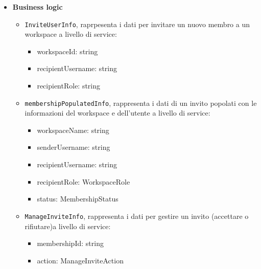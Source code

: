 \documentclass[a4paper, 11pt]{article}
\begin{document}
\begin{itemize}
	\item \textbf{Business logic}
    	\begin{itemize}
      		\item \texttt{InviteUserInfo}, raprpesenta i dati per invitare un nuovo membro a un workspace a livello di service:
    			\begin{itemize}
          			\item workspaceId: string
          			\item recipientUsername: string
          			\item recipientRole: string
        		\end{itemize}
			\item \texttt{membershipPopulatedInfo}, rappresenta i dati di un invito popolati con le informazioni del workspace e dell'utente a livello di service:
    			\begin{itemize}
          			\item workspaceName: string
          			\item senderUsername: string
          			\item recipientUsername: string
          			\item recipientRole: WorkspaceRole
          			\item status: MembershipStatus
        		\end{itemize}
			\item \texttt{ManageInviteInfo}, rappresenta i dati per gestire un invito (accettare o rifiutare)a livello di service:
    			\begin{itemize}
          			\item membershipId: string
          			\item action: ManageInviteAction
        		\end{itemize}
    	\end{itemize}


\end{itemize}
\end{document}
